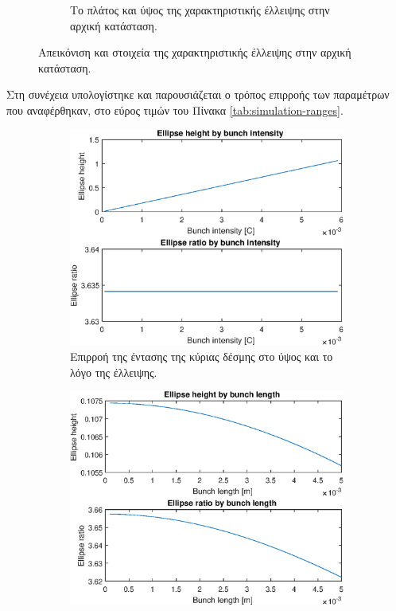 \begin{figure}[tph]
\begin{subfigure}{0.47\textwidth}
		\centering
		\caption{Το πλάτος και ύψος της χαρακτηριστικής έλλειψης στην αρχική κατάσταση.}
		\label{fig:MATLAB-variable-analysis-initial-ellipse-height-width}
	\end{subfigure}
\caption{Απεικόνιση και στοιχεία της χαρακτηριστικής έλλειψης στην αρχική κατάσταση.}
\label{fig:MATLAB-initial-ellipse}
\end{figure}

Στη συνέχεια υπολογίστηκε και παρουσιάζεται ο τρόπος επιρροής των παραμέτρων που αναφέρθηκαν, στο εύρος τιμών του Πίνακα \ref{tab:simulation-ranges}.


\begin{figure}[tph]	
	\centering
	\begin{subfigure}{0.47\textwidth}
		\includegraphics[width=\linewidth]{figures/MATLAB-variable-analysis/EBS-variables-intensity}
		\centering
		\caption{Επιρροή της έντασης της κύριας δέσμης στο ύψος και το λόγο της έλλειψης.}
		\label{fig:EBS-variables-intensity}
	\end{subfigure}
	\hfill
	\begin{subfigure}{0.47\textwidth}
		\includegraphics[width=\linewidth]{figures/MATLAB-variable-analysis/EBS-variables-length}

\end{subfigure}
\end{figure}

